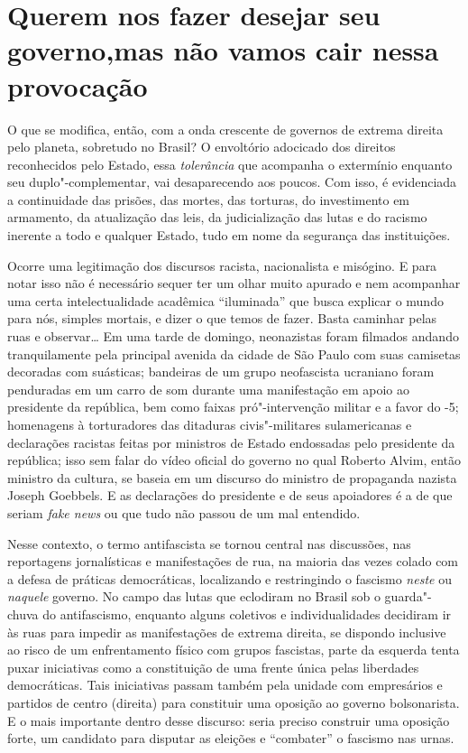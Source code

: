\section{Querem nos fazer desejar seu governo,\break mas não vamos cair nessa provocação}

O que se modifica, então, com a onda crescente de governos de
extrema direita pelo planeta, sobretudo no Brasil? O envoltório
adocicado dos direitos reconhecidos pelo Estado, essa \emph{tolerância}
que acompanha o extermínio enquanto seu duplo"-complementar, vai
desaparecendo aos poucos. Com isso, é evidenciada a continuidade das
prisões, das mortes, das torturas, do investimento em armamento, da
atualização das leis, da judicialização das lutas e do racismo inerente
a todo e qualquer Estado, tudo em nome da segurança das instituições.

Ocorre uma legitimação dos discursos racista, nacionalista e misógino. E
para notar isso não é necessário sequer ter um olhar muito apurado e nem
acompanhar uma certa intelectualidade acadêmica ``iluminada'' que busca
explicar o mundo para nós, simples mortais, e dizer o que temos de
fazer. Basta caminhar pelas ruas e observar\ldots{} Em uma tarde de domingo,
neonazistas foram filmados andando tranquilamente pela principal avenida
da cidade de São Paulo com suas camisetas decoradas com suásticas;
bandeiras de um grupo neofascista ucraniano foram penduradas em um carro
de som durante uma manifestação em apoio ao presidente da república, bem
como faixas pró"-intervenção militar e a favor do -5; homenagens à
torturadores das ditaduras civis"-militares sulamericanas e declarações
racistas feitas por ministros de Estado endossadas pelo presidente da
república; isso sem falar do vídeo oficial do governo no qual Roberto
Alvim, então ministro da cultura, se baseia em um discurso do ministro
de propaganda nazista Joseph Goebbels. E as declarações do presidente e
de seus apoiadores é a de que seriam \emph{fake news} ou que tudo não
passou de um mal entendido.

Nesse contexto, o termo antifascista se tornou central nas discussões,
nas reportagens jornalísticas e manifestações de rua, na maioria das
vezes colado com a defesa de práticas democráticas, localizando e
restringindo o fascismo \emph{neste} ou \emph{naquele} governo. No campo
das lutas que eclodiram no Brasil sob o guarda"-chuva do antifascismo,
enquanto alguns coletivos e individualidades decidiram ir às ruas para
impedir as manifestações de extrema direita, se dispondo inclusive ao
risco de um enfrentamento físico com grupos fascistas, parte da esquerda
tenta puxar iniciativas como a constituição de uma frente única pelas
liberdades democráticas. Tais iniciativas passam também pela unidade com
empresários e partidos de centro (direita) para constituir uma oposição
ao governo bolsonarista. E o mais importante dentro desse discurso:
seria preciso construir uma oposição forte, um candidato para disputar
as eleições e ``combater'' o fascismo nas urnas.

